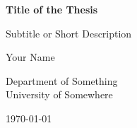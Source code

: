 \begin{titlepage}
  \centering
  \vspace*{3cm}
  {\Huge\bfseries Title of the Thesis\par}
  \vspace{1.5cm}
  {\Large Subtitle or Short Description\par}
  \vspace{3cm}
  {\Large Your Name\par}
  \vspace{0.5cm}
  {\large Department of Something\\University of Somewhere\par}
  \vfill
  {\large \today\par}
\end{titlepage}
